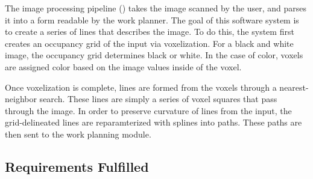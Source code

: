The image processing pipeline () takes the image scanned by the user, and parses it into a form readable by the work planner. The goal of this software system is to create a series of lines that describes the image. To do this, the system first creates an occupancy grid of the input via voxelization. For a black and white image, the occupancy grid determines black or white. In the case of color, voxels are assigned color based on the image values inside of the voxel.

Once voxelization is complete, lines are formed from the voxels through a nearest-neighbor search. These lines are simply a series of voxel squares that pass through the image. In order to preserve curvature of lines from the input, the grid-delineated lines are reparamterized with splines into paths. These paths are then sent to the work planning module.

\subsection{Requirements Fulfilled}